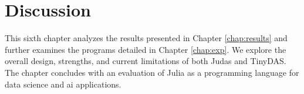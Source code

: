 \chapter{Discussion}
\label{chap:disc}

This sixth chapter analyzes the results presented in Chapter \ref{chap:results} and further examines the programs detailed in Chapter \ref{chap:exp}. We explore the overall design, strengths, and current limitations of both Judas and TinyDAS. The chapter concludes with an evaluation of Julia as a programming language for data science and \acrshort{ai} applications.


%





